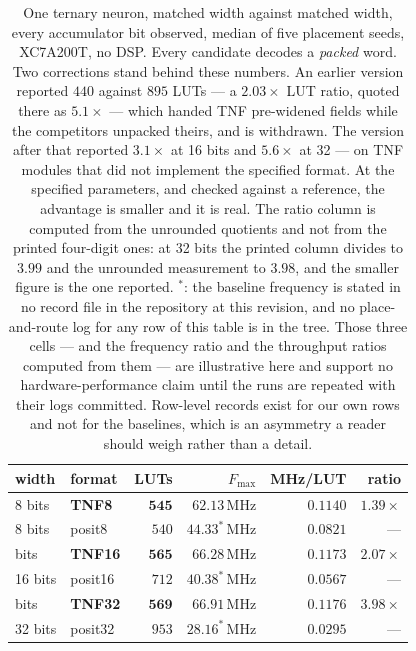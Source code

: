 \documentclass[11pt]{article}
\theoremstyle{definition}
\begin{document}
\begin{table}[t]\centering
\caption{One ternary neuron, matched width against matched width, every
accumulator bit observed, median of five placement seeds, XC7A200T, no DSP.
Every candidate decodes a \emph{packed} word. Two corrections stand behind these
numbers. An earlier version reported $440$ against $895$ LUTs --- a $2.03\times$
LUT ratio, quoted there as $5.1\times$ --- which handed TNF pre-widened fields while the competitors unpacked
theirs, and is withdrawn. The version after that reported $3.1\times$ at 16 bits
and $5.6\times$ at 32 --- on TNF modules that did not implement the specified
format. At the specified parameters, and checked against a reference, the
advantage is smaller and it is real. The ratio column is computed from the
unrounded quotients and not from the printed four-digit ones: at 32 bits the
printed column divides to $3.99$ and the unrounded measurement to $3.98$, and the
smaller figure is the one reported. $^{\ast}$: the baseline frequency is stated in
no record file in the repository at this revision, and no place-and-route log for
any row of this table is in the tree. Those three cells --- and the frequency ratio
and the throughput ratios computed from them --- are illustrative here and support
no hardware-performance claim until the runs are repeated with their logs
committed. Row-level records exist for our own rows and not for the baselines,
which is an asymmetry a reader should weigh rather than a detail.}
\label{tab:tnet}
\begin{tabular}{llrrrr}
\toprule
width & format & LUTs & $F_{\max}$ & MHz/LUT & ratio \\
\midrule
8 bits & \textbf{TNF8} & $\mathbf{545}$ & $62.13$\,MHz & $\mathbf{0.1140}$ & $\mathbf{1.39\times}$ \\
8 bits & posit8 & $540$ & $44.33^{\ast}$\,MHz & $0.0821$ & --- \\
\addlinespace
16 bits & \textbf{TNF16} & $\mathbf{565}$ & $66.28$\,MHz & $\mathbf{0.1173}$ & $\mathbf{2.07\times}$ \\
16 bits & posit16 & $712$ & $40.38^{\ast}$\,MHz & $0.0567$ & --- \\
\addlinespace
32 bits & \textbf{TNF32} & $\mathbf{569}$ & $66.91$\,MHz & $\mathbf{0.1176}$ & $\mathbf{3.98\times}$ \\
32 bits & posit32 & $953$ & $28.16^{\ast}$\,MHz & $0.0295$ & --- \\
\bottomrule
\end{tabular}
\end{table}
\end{document}
